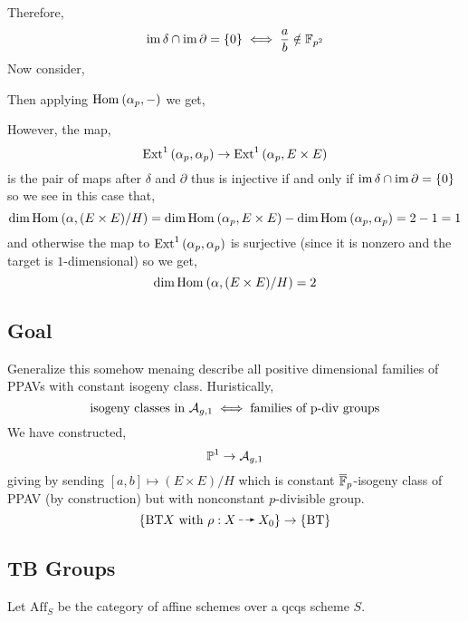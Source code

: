 \documentclass[12pt]{article}
\begin{document}
Therefore,
\[ \operatorname{\mathrm{im}}{\delta} \cap \operatorname{\mathrm{im}}{\partial} = \{ 0 \} \iff \frac{a}{b} \notin \mathbb{F}_{p^2} \]
Now consider,
\begin{center}
\end{center}
Then applying $\mathrm{Hom}_{} \left( \alpha_p, - \right)$  we get,
\begin{center}
\end{center}
However, the map,
\[ \mathrm{Ext}^{1}_{} \left( \alpha_p, \alpha_p \right) \to \mathrm{Ext}^{1}_{} \left( \alpha_p, E \times E \right) \]
is the pair of maps after $\delta$ and $\partial$ thus is injective if and only if $\operatorname{\mathrm{im}}{\delta} \cap \operatorname{\mathrm{im}}{\partial} = \{ 0 \}$ so we see in this case that,
\[ \dim{\mathrm{Hom}_{} \left( \alpha, (E \times E)/H \right)} = \dim{\mathrm{Hom}_{} \left( \alpha_p, E \times E \right)} - \dim{\mathrm{Hom}_{} \left( \alpha_p, \alpha_p \right)} = 2 - 1 = 1 \]
and otherwise the map to $\mathrm{Ext}^{1}_{} \left( \alpha_p, \alpha_p \right)$ is surjective (since it is nonzero and the target is $1$-dimensional) so we get,
\[ \dim{\mathrm{Hom}_{} \left( \alpha, (E \times E)/H \right)} = 2 \]

\subsection{Goal}

Generalize this somehow menaing describe all positive dimensional families of PPAVs with constant isogeny class. Huristically, 
\[ \text{isogeny classes in } \mathcal{A}_{g,1} \iff \text{families of p-div groups} \]
We have constructed,
\[ \mathbb{P}^1 \to \mathcal{A}_{g,1} \]
giving by sending $[a,b] \mapsto (E \times E)/H$ which is constant $\overline{\mathbb{F}}_p$-isogeny class of PPAV (by construction) but with nonconstant $p$-divisible group. 
\[ \{ \text{BT} X \text{ with } \rho : X \rat X_0 \} \to \{ \text{BT} \} \]

\subsection{TB Groups}

\newcommand{\Aff}{\mathrm{Aff}}

Let $\Aff_S$ be the category of affine schemes over a qcqs scheme $S$.
\end{document}
